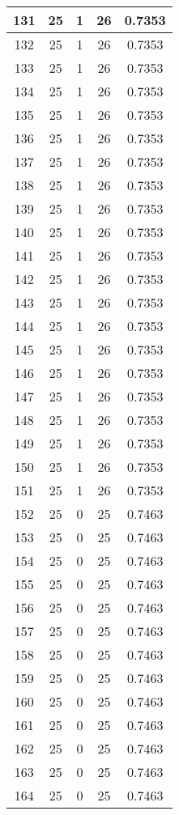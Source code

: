 \documentclass[letterpaper, 12pt]{article}
\begin{document}
\begin{longtable}{|c|c|c|c|c|}
\hline
131 & 25 & 1 & 26 & 0.7353 \\
\hline
132 & 25 & 1 & 26 & 0.7353 \\
\hline
133 & 25 & 1 & 26 & 0.7353 \\
\hline
134 & 25 & 1 & 26 & 0.7353 \\
\hline
135 & 25 & 1 & 26 & 0.7353 \\
\hline
136 & 25 & 1 & 26 & 0.7353 \\
\hline
137 & 25 & 1 & 26 & 0.7353 \\
\hline
138 & 25 & 1 & 26 & 0.7353 \\
\hline
139 & 25 & 1 & 26 & 0.7353 \\
\hline
140 & 25 & 1 & 26 & 0.7353 \\
\hline
141 & 25 & 1 & 26 & 0.7353 \\
\hline
142 & 25 & 1 & 26 & 0.7353 \\
\hline
143 & 25 & 1 & 26 & 0.7353 \\
\hline
144 & 25 & 1 & 26 & 0.7353 \\
\hline
145 & 25 & 1 & 26 & 0.7353 \\
\hline
146 & 25 & 1 & 26 & 0.7353 \\
\hline
147 & 25 & 1 & 26 & 0.7353 \\
\hline
148 & 25 & 1 & 26 & 0.7353 \\
\hline
149 & 25 & 1 & 26 & 0.7353 \\
\hline
150 & 25 & 1 & 26 & 0.7353 \\
\hline
151 & 25 & 1 & 26 & 0.7353 \\
\hline
152 & 25 & 0 & 25 & 0.7463 \\
\hline
153 & 25 & 0 & 25 & 0.7463 \\
\hline
154 & 25 & 0 & 25 & 0.7463 \\
\hline
155 & 25 & 0 & 25 & 0.7463 \\
\hline
156 & 25 & 0 & 25 & 0.7463 \\
\hline
157 & 25 & 0 & 25 & 0.7463 \\
\hline
158 & 25 & 0 & 25 & 0.7463 \\
\hline
159 & 25 & 0 & 25 & 0.7463 \\
\hline
160 & 25 & 0 & 25 & 0.7463 \\
\hline
161 & 25 & 0 & 25 & 0.7463 \\
\hline
162 & 25 & 0 & 25 & 0.7463 \\
\hline
163 & 25 & 0 & 25 & 0.7463 \\
\hline
164 & 25 & 0 & 25 & 0.7463 \\

\end{longtable}
\end{document}
